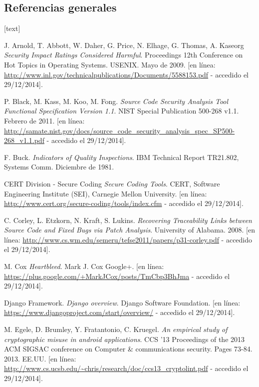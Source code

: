 \documentclass{beamer}
\begin{document}
	\subsection{Referencias generales}
	\begin{thebibliography}{99}

	[text]

	J. Arnold, T. Abbott, W. Daher, G. Price, N. Elhage, G. Thomas, A. Kaseorg
	\emph{Security Impact Ratings Considered Harmful}.
	Proceedings 12th Conference on Hot Topics in Operating Systems. USENIX.
	Mayo de 2009.
	[en línea: \url{http://www.inl.gov/technicalpublications/Documents/5588153.pdf} - accedido el 29/12/2014].
	
	P. Black, M. Kass, M. Koo, M. Fong.
	\emph{Source Code Security Analysis Tool Functional Specification Version 1.1}.
	NIST Special Publication 500-268 v1.1.
	Febrero de 2011. 
	[en línea: \url{http://samate.nist.gov/docs/source_code_security_analysis_spec_SP500-268_v1.1.pdf} - accedido el 29/12/2014].
	
	F. Buck.
	\emph{Indicators of Quality Inspections}.
	IBM Technical Report TR21.802, Systems Comm.
	Diciembre de 1981.
	
	CERT Division - Secure Coding
	\emph{Secure Coding Tools}.
	CERT, Software Engineering Institute (SEI), Carnegie Mellon University.
	[en línea: \url{http://www.cert.org/secure-coding/tools/index.cfm} - accedido el 29/12/2014].
	
	C. Corley, L. Etzkorn, N. Kraft, S. Lukins.
	\emph{Recovering Traceability Links between Source Code	and Fixed Bugs via Patch Analysis}.
	University of Alabama. 2008.
	[en línea: \url{http://www.cs.wm.edu/semeru/tefse2011/papers/p31-corley.pdf} - accedido el 29/12/2014].
	
	M. Cox
	\emph{Heartbleed}.
	Mark J. Cox Google+.
	[en línea: \url{https://plus.google.com/+MarkJCox/posts/TmCbp3BhJma} - accedido el 29/12/2014].
	
	Django Framework.
	\emph{Django overview}.
	Django Software Foundation.
	[en línea: \url{https://www.djangoproject.com/start/overview/} - accedido el 29/12/2014].
	
	M. Egele, D. Brumley, Y. Fratantonio, C. Kruegel.
	\emph{An empirical study of cryptographic misuse in android applications}.
	CCS '13 Proceedings of the 2013 ACM SIGSAC conference on Computer \& communications security. Pages 73-84.
	2013. EE.UU.
	[en línea: \url{http://www.cs.ucsb.edu/~chris/research/doc/ccs13_cryptolint.pdf} - accedido el 29/12/2014].
	

\end{thebibliography}
\end{document}
